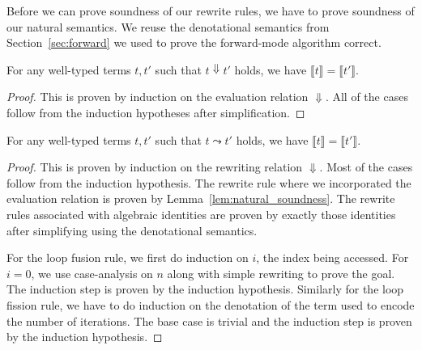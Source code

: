 Before we can prove soundness of our rewrite rules, we have to prove soundness of our natural semantics.
We reuse the denotational semantics from Section~\ref{sec:forward} we used to prove the forward-mode algorithm correct.

\begin{lemma}\label{lem:natural_soundness}
  For any well-typed terms $t, t'$ such that $t \Downarrow t'$ holds, we have $\llbracket t \rrbracket = \llbracket t' \rrbracket$.
\end{lemma}
\begin{proof}
  This is proven by induction on the evaluation relation $\Downarrow$.
  All of the cases follow from the induction hypotheses after simplification.
\end{proof}

\begin{theorem}
  For any well-typed terms $t, t'$ such that $t \leadsto t'$ holds, we have $\llbracket t \rrbracket = \llbracket t' \rrbracket$.
\end{theorem}
\begin{proof}
  This is proven by induction on the rewriting relation $\Downarrow$.
  Most of the cases follow from the induction hypothesis.
  The rewrite rule where we incorporated the evaluation relation is proven by Lemma~\ref{lem:natural_soundness}.
  The rewrite rules associated with algebraic identities are proven by exactly those identities after simplifying using the denotational semantics.

  For the loop fusion rule, we first do induction on $i$, the index being accessed.
  For $i = 0$, we use case-analysis on $n$ along with simple rewriting to prove the goal. The induction step is proven by the induction hypothesis.
  Similarly for the loop fission rule, we have to do induction on the denotation of the term used to encode the number of iterations.
  The base case is trivial and the induction step is proven by the induction hypothesis.
\end{proof}